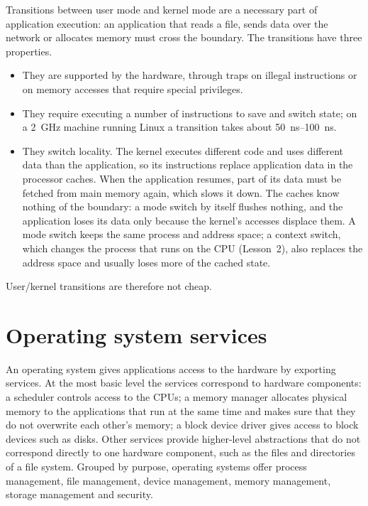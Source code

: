 \documentclass[../main.tex]{subfiles}
\begin{document}
Transitions between user mode and kernel mode are a necessary part of
application execution: an application that reads a file, sends data over
the network or allocates memory must cross the
boundary.  The transitions have
three properties.
\begin{itemize}
  \item They are supported by the hardware, through traps on illegal
    instructions or on memory accesses that require special privileges.
  \item They require executing a number of instructions to save and
    switch state; on a \SI{2}{\giga\hertz} machine running Linux a
    transition takes about \SIrange{50}{100}{\nano\second}.
  \item They switch locality.  The kernel executes different code and uses
    different data than the application, so its instructions replace
    application data in the processor caches.  When the application
    resumes, part of its data must be fetched from main memory again,
    which slows it down.  The caches know nothing of the boundary: a mode
    switch by itself flushes nothing, and the application loses its data
    only because the kernel's accesses displace them.  A mode switch keeps
    the same process and address space; a context switch, which changes
    the process that runs on the CPU (Lesson~2), also replaces the address
    space and usually loses more of the cached state.
\end{itemize}
User/kernel transitions are therefore not cheap.

\section{Operating system services}
\label{sec:l01-services}

An operating system gives applications access to the hardware by exporting
services.  At the
most basic level the services correspond to hardware components: a
scheduler controls access to the CPUs; a memory manager allocates physical
memory to the applications that run at the same time and makes sure that
they do not overwrite each other's memory; a block device driver gives
access to block devices such as disks.  Other services provide higher-level
abstractions that do not correspond directly to one hardware component,
such as the files and directories of a file system.  Grouped by purpose,
operating systems offer process management, file management, device
management, memory management, storage management and
security.
\end{document}
